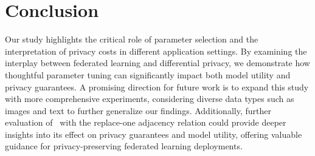 \section{Conclusion}
Our study highlights the critical role of parameter selection and the interpretation of privacy costs in different application settings. 
%
By examining the interplay between federated learning and differential privacy, we demonstrate how thoughtful parameter tuning can significantly impact both model utility and privacy guarantees. 
%
A promising direction for future work is to expand this study with more comprehensive experiments, considering diverse data types such as images and text to further generalize our findings. 
%
Additionally, further evaluation of \sys~with the replace-one adjacency relation could provide deeper insights into its effect on privacy guarantees and model utility, offering valuable guidance for privacy-preserving federated learning deployments.
